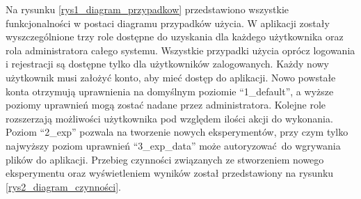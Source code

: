 Na rysunku \ref{rys1_diagram_przypadkow} przedstawiono wszystkie funkcjonalności w postaci diagramu przypadków użycia. W aplikacji zostały wyszczególnione trzy role dostępne do uzyskania dla każdego użytkownika oraz rola administratora całego systemu. Wszystkie przypadki użycia oprócz logowania i rejestracji są dostępne tylko dla użytkowników zalogowanych. Każdy nowy użytkownik musi założyć konto, aby mieć dostęp do aplikacji. Nowo powstałe konta otrzymują uprawnienia na domyślnym poziomie \enquote{1\_default}, a wyższe poziomy uprawnień mogą zostać nadane przez administratora. Kolejne role rozszerzają możliwości użytkownika pod względem ilości akcji do wykonania. Poziom \enquote{2\_exp} pozwala na tworzenie nowych eksperymentów, przy czym tylko najwyższy poziom uprawnień \enquote{3\_exp\_data}  może autoryzować do wgrywania plików do aplikacji. Przebieg czynności związanych ze stworzeniem nowego eksperymentu oraz wyświetleniem wyników został przedstawiony na rysunku \ref{rys2_diagram_czynności}. 



